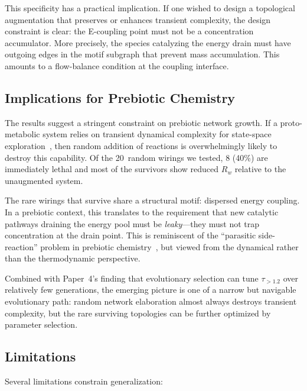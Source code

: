 \documentclass[twocolumn,showpacs,preprintnumbers,amsmath,amssymb,prd,floatfix]{revtex4-2}
\newcommand{\tauexp}{\tau_{>1.2}}
\newcommand{\Rw}{R_w}
\begin{document}
This specificity has a practical implication. If one wished to design a topological augmentation that preserves or enhances transient complexity, the design constraint is clear: the E-coupling point must not be a concentration accumulator. More precisely, the species catalyzing the energy drain must have outgoing edges in the motif subgraph that prevent mass accumulation. This amounts to a flow-balance condition at the coupling interface.

\subsection{Implications for Prebiotic Chemistry}

The results suggest a stringent constraint on prebiotic network growth. If a proto-metabolic system relies on transient dynamical complexity for state-space exploration~\cite{nghe2015, vanchurin2022}, then random addition of reactions is overwhelmingly likely to destroy this capability. Of the 20~random wirings we tested, 8 (40\%) are immediately lethal and most of the survivors show reduced $\Rw$ relative to the unaug\-mented system.

The rare wirings that survive share a structural motif: dispersed energy coupling. In a prebiotic context, this translates to the requirement that new catalytic pathways draining the energy pool must be \textit{leaky}---they must not trap concentration at the drain point. This is reminiscent of the ``parasitic side-reaction'' problem in prebiotic chemistry~\cite{szostak2012}, but viewed from the dynamical rather than the thermodynamic perspective.

Combined with Paper~4's finding that evolutionary selection can tune $\tauexp$ over relatively few generations, the emerging picture is one of a narrow but navigable evolutionary path: random network elaboration almost always destroys transient complexity, but the rare surviving topologies can be further optimized by parameter selection.

\subsection{Limitations}

Several limitations constrain generalization:
\end{document}
